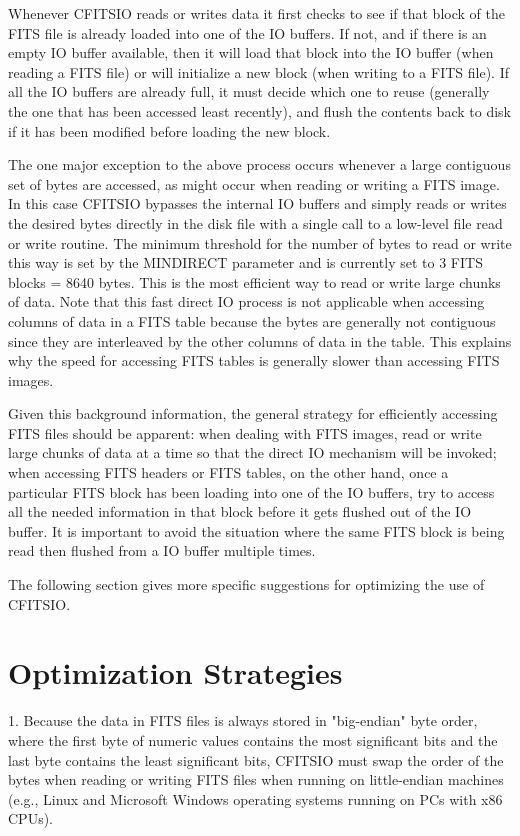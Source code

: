 \documentclass[11pt]{book}
\begin{document}
Whenever CFITSIO reads or writes data it first checks to see if that
block of the FITS file is already loaded into one of the IO buffers.
If not, and if there is an empty IO buffer available, then it will load
that block into the IO buffer (when reading a FITS file) or will
initialize a new block (when writing to a FITS file).  If all the IO
buffers are already full, it must decide which one to reuse (generally
the one that has been accessed least recently), and flush the contents
back to disk if it has been modified before loading the new block.

The one major exception to the above process occurs whenever a large
contiguous set of bytes are accessed, as might occur when reading or
writing a FITS image.  In this case CFITSIO bypasses the internal IO
buffers and simply reads or writes the desired bytes directly in the
disk file with a single call to a low-level file read or write
routine.  The minimum threshold for the number of bytes to read or
write this way is set by the MINDIRECT parameter and is currently set
to 3 FITS blocks = 8640 bytes.  This is the most efficient way to read
or write large chunks of data.  Note that this fast direct IO process is not
applicable when accessing columns of data in a FITS table because the
bytes are generally not contiguous since they are interleaved by the
other columns of data in the table.  This explains why the speed for
accessing FITS tables is generally slower than accessing
FITS images.

Given this background information, the general strategy for efficiently
accessing FITS files should be apparent:  when dealing with FITS
images, read or write large chunks of data at a time so that the direct
IO mechanism will be invoked;  when accessing FITS headers or FITS
tables, on the other hand, once a particular FITS block has been
loading into one of the IO buffers, try to access all the needed
information in that block before it gets flushed out of the IO buffer.
It is important to avoid the situation where the same FITS block is
being read then flushed from a IO buffer multiple times.

The following section gives more specific suggestions for optimizing
the use of CFITSIO.


\section{Optimization Strategies}

1.  Because the data in FITS files is always stored in "big-endian" byte order,
where the first byte of numeric values contains the most significant bits and the
last byte contains the least significant bits, CFITSIO must swap the order of the bytes
when reading or writing FITS files when running on little-endian machines (e.g.,
Linux and Microsoft Windows operating systems running on PCs with x86 CPUs).
\end{document}
